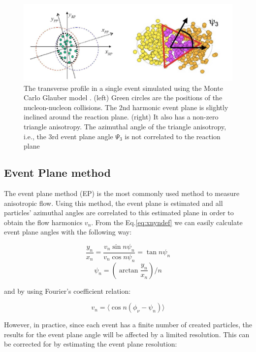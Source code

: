 \begin{figure}[h]
\centerline{\includegraphics[width=13.0cm]{figures/fig_complxshape}}
\caption{The transverse profile in a single event simulated using the Monte Carlo Glauber model \cite{Miller:2007ri, Bzdak:2006qk}. (left) Green circles are the positions of the nucleon-nucleon collisions. The 2nd harmonic event plane is slightly inclined around the reaction plane. (right) It also has a non-zero triangle anisotropy. The azimuthal angle of the triangle anisotropy, i.e., the 3rd event plane angle $\Psi_3$ is not correlated to the reaction plane}
\label{fig:complexshape}
\end{figure}



\subsection{Event Plane method}

The event plane method (EP) is the most commonly used method to measure anisotropic flow. Using this method, the event plane is estimated and all particles' azimuthal angles are correlated to this estimated plane in order to obtain the flow harmonics $v_n$. From the Eq.\ref{eq:xnyndef} we can easily calculate event plane angles with the following way:


\begin{equation}
\frac{y_n}{x_n}=\frac{v_n\sin{n\psi_n}}{v_n\cos{n\psi_n}}=\tan{n\psi_n}
\end{equation}
\begin{equation}
\psi_n=(\arctan{\frac{y_n}{x_n}})/n
\end{equation}


and by using Fourier's coefficient relation:

\begin{equation}
v_n=\langle\cos{n(\phi_\nu - \psi_n)}\rangle 
\label{vndef}
\end{equation}
\smallskip


However, in practice, since each event has a finite number of created particles, the results for the event plane angle will be affected by a limited resolution. This can be corrected for by estimating the event plane resolution:

